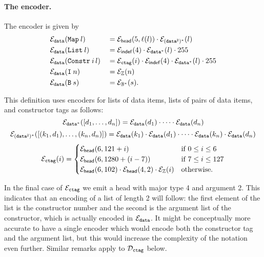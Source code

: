 \paragraph{The encoder.} The encoder is given by
\begin{alignat*}{2}
&  \mathcal{E}_{\mathtt{data}}(\mathtt{Map}\: l) && = \mathcal{E}_{\mathsf{head}}(5,\operatorname{\ell}(l)) \cdot \mathcal{E}_{\mathtt{(data^2)^*}}(l)\\
&  \mathcal{E}_{\mathtt{data}}(\mathtt{List}\: l) && = \mathcal{E}_{\mathsf{indef}}(4) \cdot \mathcal{E}_{\mathtt{data^*}}(l) \cdot 255\\
&  \mathcal{E}_{\mathtt{data}}(\mathtt{Constr}\: i\, l) && = \mathcal{E}_{\texttt{ctag}}(i) \cdot \mathcal{E}_{\mathsf{indef}}(4) \cdot  \mathcal{E}_{\mathtt{data^*}}(l) \cdot 255\\
& \mathcal{E}_{\mathtt{data}}(\mathtt{I}\: n) && = \mathcal{E}_{\mathbb{Z}}(n)\\
&  \mathcal{E}_{\mathtt{data}}(\mathtt{B}\: s) && = \mathcal{E}_{\mathbb{B}^*}(s).
\end{alignat*}

\noindent This definition uses encoders for lists of data items, lists of pairs
of data items, and constructor tags as follows:
$$
\mathcal{E}_{\mathtt{data^*}}([d_1, \ldots, d_n]) = \mathcal{E}_{\mathtt{data}}(d_1) \cdot \cdots \cdot \mathcal{E}_{\mathtt{data}}(d_n)
$$
$$
\mathcal{E}_{\mathtt{(data^2)^*}}([(k_1,d_1), \ldots, (k_n, d_n)]) = \mathcal{E}_{\mathtt{data}}(k_1) \cdot \mathcal{E}_{\mathtt{data}}(d_1) \cdot \cdots \cdot \mathcal{E}_{\mathtt{data}}(k_n) \cdot \mathcal{E}_{\mathtt{data}}(d_n)
$$
$$
\mathcal{E}_{\texttt{ctag}}(i) =
\begin{cases}
  \mathcal{E}_{\mathsf{head}}(6,121+i) & \text{if $0 \leq i \leq 6$}\\
  \mathcal{E}_{\mathsf{head}}(6,1280+(i-7)) & \text{if $7 \leq i \leq 127$}\\
  \mathcal{E}_{\mathsf{head}}(6,102) \cdot \mathcal{E}_{\mathsf{head}}(4,2) \cdot \mathcal{E}_{\mathbb{Z}}(i) & \text{otherwise}.\\
  \end{cases}
$$

\noindent
In the final case of $\mathcal{E}_{\texttt{ctag}}$ we emit a head with major type 4 and argument
2. This indicates that an encoding of a list of length 2 will follow: the first
element of the list is the constructor number and the second is the argument
list of the constructor, which is actually encoded in $\mathcal{E}_{\mathtt{data}}$.  It might be
conceptually more accurate to have a single encoder which would encode both the
constructor tag and the argument list, but this would increase the complexity of
the notation even further.  Similar remarks apply to $\mathcal{D}_{\texttt{ctag}}$ below.



